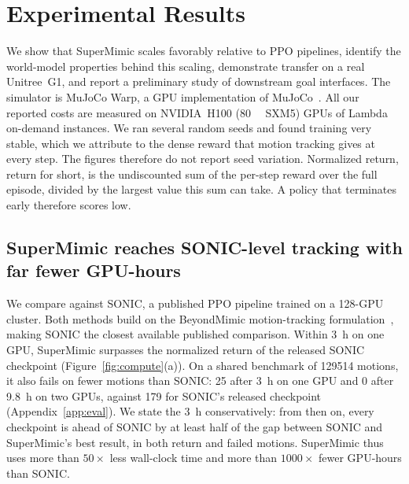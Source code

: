 \section{Experimental Results}

We show that SuperMimic scales favorably relative to PPO pipelines, identify the world-model properties behind this scaling, demonstrate transfer on a real Unitree~G1, and report a preliminary study of downstream goal interfaces. The simulator is MuJoCo Warp, a GPU implementation of MuJoCo~\citep{todorov2012mujoco}. All our reported costs are measured on NVIDIA~H100 (\qty{80}{\giga\byte} SXM5) GPUs of Lambda on-demand instances. We ran several random seeds and found training very stable, which we attribute to the dense reward that motion tracking gives at every step. The figures therefore do not report seed variation. Normalized return, return for short, is the undiscounted sum of the per-step reward over the full episode, divided by the largest value this sum can take. A policy that terminates early therefore scores low.

\subsection{SuperMimic reaches SONIC-level tracking with far fewer GPU-hours}
\label{sec:scaling}

We compare against SONIC, a published PPO pipeline trained on a 128-GPU cluster. Both methods build on the BeyondMimic motion-tracking formulation~\citep{liao2025beyondmimic}, making SONIC the closest available published comparison. Within \qty{3}{\hour} on one GPU, SuperMimic surpasses the normalized return of the released SONIC checkpoint (Figure~\ref{fig:compute}(a)). On a shared benchmark of \num{129514} motions, it also fails on fewer motions than SONIC: 25 after \qty{3}{\hour} on one GPU and 0 after \qty{9.8}{\hour} on two GPUs, against 179 for SONIC's released checkpoint (Appendix~\ref{app:eval}). We state the \qty{3}{\hour} conservatively: from then on, every checkpoint is ahead of SONIC by at least half of the gap between SONIC and SuperMimic's best result, in both return and failed motions. SuperMimic thus uses more than $50\times$ less wall-clock time and more than $1000\times$ fewer GPU-hours than SONIC.

